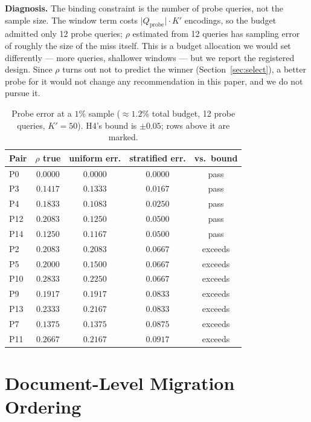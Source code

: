 \documentclass[conference]{IEEEtran}
\begin{document}
\textbf{Diagnosis.} The binding constraint is the number of probe queries, not the sample
size. The window term costs $\lvert Q_{\text{probe}}\rvert \cdot K'$ encodings, so the
budget admitted only 12 probe queries; $\rho$ estimated from 12 queries has sampling error
of roughly the size of the miss itself. This is a budget allocation we would set
differently --- more queries, shallower windows --- but we report the registered design.
Since $\rho$ turns out not to predict the winner (Section~\ref{sec:select}), a better
probe for it would not change any recommendation in this paper, and we do not pursue it.

\begin{table}[t]
\centering
\caption{Probe error at a $1\%$ sample ($\approx 1.2\%$ total budget, 12 probe queries,
$K' = 50$). H4's bound is $\pm 0.05$; rows above it are marked.}
\label{tab:probe}
\small
\begin{tabular}{@{}lcccc@{}}
\toprule
Pair & $\rho$ true & uniform err. & stratified err. & vs.\ bound \\
\midrule
P0  & $0.0000$ & $0.0000$ & $0.0000$ & pass \\
P3  & $0.1417$ & $0.1333$ & $0.0167$ & pass \\
P4  & $0.1833$ & $0.1083$ & $0.0250$ & pass \\
P12 & $0.2083$ & $0.1250$ & $0.0500$ & pass \\
P14 & $0.1250$ & $0.1167$ & $0.0500$ & pass \\
P2  & $0.2083$ & $0.2083$ & $0.0667$ & exceeds \\
P5  & $0.2000$ & $0.1500$ & $0.0667$ & exceeds \\
P10 & $0.2833$ & $0.2250$ & $0.0667$ & exceeds \\
P9  & $0.1917$ & $0.1917$ & $0.0833$ & exceeds \\
P13 & $0.2333$ & $0.2167$ & $0.0833$ & exceeds \\
P7  & $0.1375$ & $0.1375$ & $0.0875$ & exceeds \\
P11 & $0.2667$ & $0.2167$ & $0.0917$ & exceeds \\
\bottomrule
\end{tabular}
\end{table}

\section{Document-Level Migration Ordering}\label{sec:order}
\end{document}
